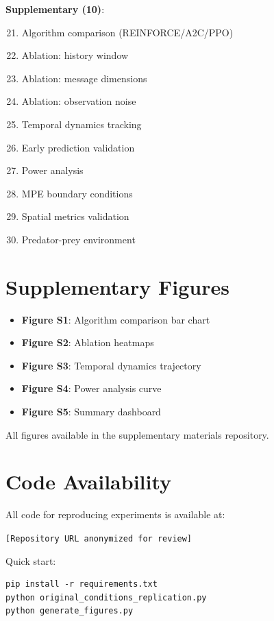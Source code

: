 \documentclass[twoside]{article}
\begin{document}
\textbf{Supplementary (10)}:
\begin{enumerate}
    \setcounter{enumi}{20}
    \item Algorithm comparison (REINFORCE/A2C/PPO)
    \item Ablation: history window
    \item Ablation: message dimensions
    \item Ablation: observation noise
    \item Temporal dynamics tracking
    \item Early prediction validation
    \item Power analysis
    \item MPE boundary conditions
    \item Spatial metrics validation
    \item Predator-prey environment
\end{enumerate}

\section{Supplementary Figures}

\begin{itemize}
    \item \textbf{Figure S1}: Algorithm comparison bar chart
    \item \textbf{Figure S2}: Ablation heatmaps
    \item \textbf{Figure S3}: Temporal dynamics trajectory
    \item \textbf{Figure S4}: Power analysis curve
    \item \textbf{Figure S5}: Summary dashboard
\end{itemize}

All figures available in the supplementary materials repository.

\section{Code Availability}

All code for reproducing experiments is available at:

\texttt{[Repository URL anonymized for review]}

Quick start:
\begin{verbatim}
pip install -r requirements.txt
python original_conditions_replication.py
python generate_figures.py
\end{verbatim}
\end{document}
